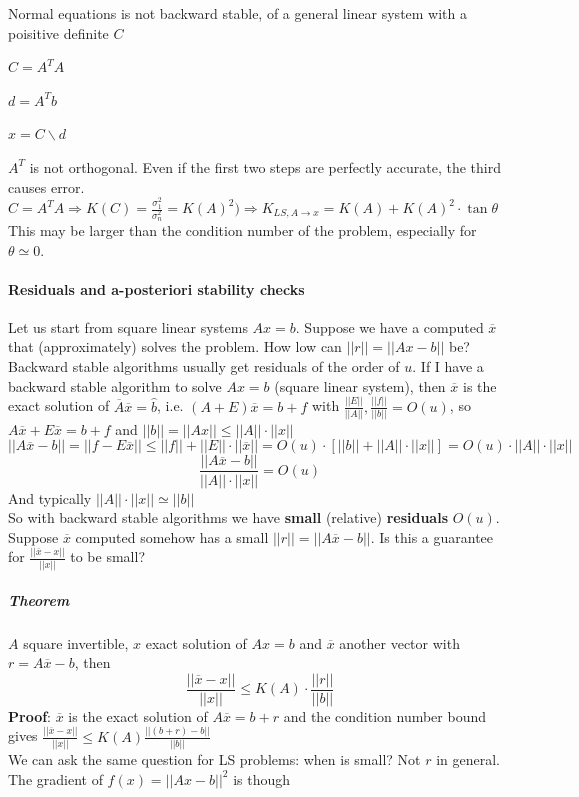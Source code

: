 \documentclass[10pt]{report}
\begin{document}
Normal equations is not backward stable, of a general linear system with a poisitive definite $C$ \begin{list}{}{}
	\item $C = A^TA$
	\item $d = A^Tb$
	\item $x = C \backslash d$
\end{list}
$A^T$ is not orthogonal. Even if the first two steps are perfectly accurate, the third causes error.
$C=A^TA\Rightarrow K(C) = \frac{\sigma_1^2}{\sigma_n^2} = K(A)^2) \Rightarrow K_{LS,A\rightarrow x} = K(A)+K(A)^2\cdot\tan\theta$\\
This may be larger than the condition number of the problem, especially for $\theta\simeq 0$.
\paragraph{Residuals and a-posteriori stability checks} Let us start from square linear systems $Ax=b$. Suppose we have a computed $\overline{x}$ that (approximately) solves the problem. How low can $||r|| = ||Ax-b||$ be? Backward stable algorithms usually get residuals of the order of $u$. If I have a backward stable algorithm to solve $Ax=b$ (square linear system), then $\overline{x}$ is the exact solution of $\overline{A}\overline{x}=\hat{b}$, i.e. $(A+E)\overline{x}=b+f$ with $\frac{||E||}{||A||},\frac{||f||}{||b||} = O(u)$, so $A\overline{x}+E\overline{x}=b+f$ and $||b|| = ||Ax|| \leq ||A||\cdot||x||$
$$||A\overline{x}-b||=||f-E\overline{x}||\leq ||f||+||E||\cdot||\overline{x}||=O(u)\cdot[||b||+||A||\cdot||x||]=O(u)\cdot||A||\cdot||x||$$
$$\frac{||A\overline{x}-b||}{||A||\cdot||x||}=O(u)$$
And typically $||A||\cdot||x||\simeq ||b||$\\
So with backward stable algorithms we have \textbf{small} (relative) \textbf{residuals} $O(u)$.\\
Suppose $\overline{x}$ computed somehow has a small $||r||=||A\overline{x}-b||$. Is this a guarantee for $\frac{||\overline{x}-x||}{||x||}$ to be small?
\subparagraph{Theorem} $A$ square invertible, $x$ exact solution of $Ax = b$ and $\overline{x}$ another vector with $r = A\overline{x}-b$, then $$\frac{||\overline{x}-x||}{||x||}\leq K(A)\cdot\frac{||r||}{||b||}$$
\textbf{Proof}: $\overline{x}$ is the exact solution of $A\overline{x}=b+r$ and the condition number bound gives $\frac{||\overline{x}-x||}{||x||}\leq K(A)\frac{||(b+r)-b||}{||b||}$\\
We can ask the same question for LS problems: when is small? Not $r$ in general. The gradient of $f(x) = ||Ax-b||^2$ is though 
\end{document}
